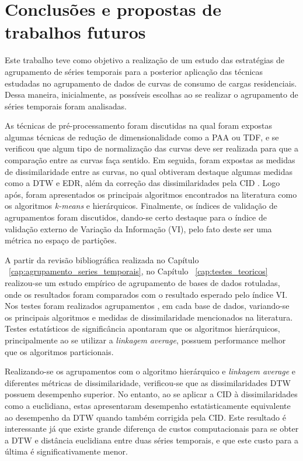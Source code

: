 \chapter{Conclusões e propostas de trabalhos futuros} \label{cap:conclusao}

Este trabalho teve como objetivo a realização de um estudo das estratégias de agrupamento de séries temporais para a posterior aplicação das técnicas estudadas no agrupamento de dados de curvas de consumo de cargas residenciais. Dessa maneira, inicialmente, as possíveis escolhas ao se realizar o agrupamento de séries temporais foram analisadas.

As técnicas de pré-processamento foram discutidas na qual foram expostas algumas técnicas de redução de dimensionalidade como a PAA ou TDF, e se verificou que algum tipo de normalização das curvas deve ser realizada para que a comparação entre as curvas faça sentido. Em seguida, foram expostas as medidas de dissimilaridade entre as curvas, no qual obtiveram destaque algumas medidas como a DTW e EDR, além da correção das dissimilaridades pela CID \parencite{CID}. Logo após, foram apresentados os principais algoritmos encontrados na literatura como os algoritmos \emph{k-means} e hierárquicos. Finalmente, os índices de validação de agrupamentos foram discutidos, dando-se certo destaque para o índice de validação externo de Variação da Informação (VI), pelo fato deste ser uma métrica no espaço de partições.

A partir da revisão bibliográfica realizada no Capítulo ~\ref{cap:agrupamento_series_temporais}, no Capítulo ~\ref{cap:testes_teoricos} realizou-se um estudo empírico de agrupamento de bases de dados rotuladas, onde os resultados foram comparados com o resultado esperado pelo índice VI. Nos testes foram realizados agrupamentos  , em cada base de dados, variando-se os principais algoritmos e medidas de dissimilaridade mencionados na literatura. Testes estatísticos de significância apontaram que os algoritmos hierárquicos, principalmente ao se utilizar a \emph{linkagem} \emph{average}, possuem performance melhor que os algoritmos particionais. 

Realizando-se os agrupamentos com o algoritmo hierárquico e \emph{linkagem average} e diferentes métricas de dissimilaridade, verificou-se que as dissimilaridades DTW \parencite{DTW} possuem desempenho superior. No entanto, ao se aplicar a CID à dissimilaridades como a euclidiana, estas apresentaram desempenho estatisticamente equivalente ao desempenho da DTW quando também corrigida pela CID. Este resultado é interessante já que existe grande diferença de custos computacionais para se obter a DTW e distância euclidiana entre duas séries temporais, e que este custo para a última é significativamente menor.

